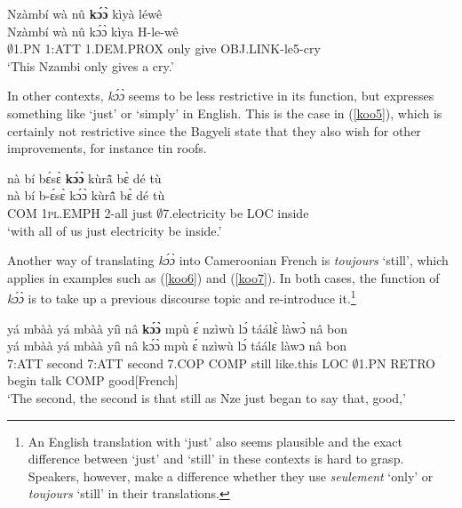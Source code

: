 \begin{exe} 
\ex\label{koo4}
  \glll Nzàmbí wà nû {\bfseries kɔ́ɔ̀} kìyà léwê \\
         Nzàmbí wà nû kɔ́ɔ̀ kìya H-le-wê \\
        $\emptyset$1.PN 1:ATT 1.DEM.PROX only give OBJ.LINK-le5-cry  \\
    \trans `This Nzambi only gives a cry.'
\end{exe}

In other contexts, {\itshape kɔ́ɔ̀} seems to be less restrictive in its function, but expresses something like `just' or `simply' in English. This is the case in (\ref{koo5}), which is certainly not restrictive since the Bagyeli state that they also wish for other improvements, for instance tin roofs.

\begin{exe} 
\ex\label{koo5}
  \glll nà bí bɛ́sɛ̀ {\bfseries kɔ́ɔ̀} kùrã̂  bɛ̀ dé tù \\
       nà bí b-ɛ́sɛ̀ kɔ́ɔ̀ kùrã̂  bɛ̀ dé tù \\
        COM 1\textsc{pl}.EMPH 2-all just $\emptyset$7.electricity  be LOC inside \\
    \trans `with all of us just electricity be inside.'
\end{exe}

Another way of translating {\itshape kɔ́ɔ̀} into Cameroonian French is {\itshape toujours} `still', which applies in examples such as (\ref{koo6}) and (\ref{koo7}). In both cases, the function of {\itshape kɔ́ɔ̀} is to take up a previous discourse topic and re-introduce it.\footnote{An English translation with `just' also seems plausible and the exact difference between `just' and `still' in these contexts is hard to grasp. Speakers, however, make a difference whether they use {\itshape seulement} `only' or {\itshape toujours} `still' in their translations.}

\begin{exe} 
\ex\label{koo6} 
  \glll  yá mbàà yá mbàà yíì nâ {\bfseries kɔ́ɔ̀} mpù ɛ́ nzìwù lɔ́ táálɛ̀ làwɔ̀ nâ bon \\
         yá mbàà yá mbàà yíì nâ kɔ́ɔ̀ mpù ɛ́ nzìwù lɔ́ táálɛ làwɔ nâ bon \\
         7:ATT second 7:ATT second 7.COP COMP still like.this LOC $\emptyset$1.PN RETRO begin talk COMP good[French]   \\
    \trans `The second, the second is that still as Nze just began to say that, good,'
\end{exe}

